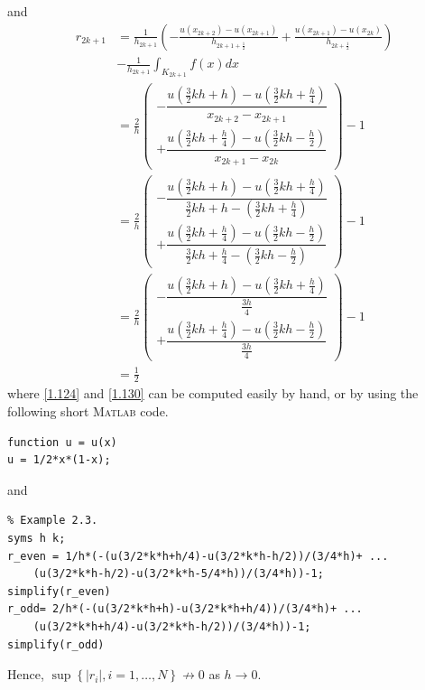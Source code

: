 \documentclass[a4paper]{article}
\numberwithin{equation}{section}
\begin{document}
and
\begin{align}
{r_{2k + 1}} &= \frac{1}{{{h_{2k + 1}}}}\left( { - \frac{{u\left( {{x_{2k + 2}}} \right) - u\left( {{x_{2k + 1}}} \right)}}{{{h_{2k + 1 + \frac{1}{2}}}}} + \frac{{u\left( {{x_{2k + 1}}} \right) - u\left( {{x_{2k}}} \right)}}{{{h_{2k + \frac{1}{2}}}}}} \right)\\
& - \frac{1}{{{h_{2k + 1}}}}\int_{{K_{2k + 1}}} {f\left( x \right)dx} \\
& = \frac{2}{h}\left( \begin{array}{l}
 - \dfrac{{u\left( {\frac{3}{2}kh + h} \right) - u\left( {\frac{3}{2}kh + \frac{h}{4}} \right)}}{{{x_{2k + 2}} - {x_{2k + 1}}}}\\
 + \dfrac{{u\left( {\frac{3}{2}kh + \frac{h}{4}} \right) - u\left( {\frac{3}{2}kh - \frac{h}{2}} \right)}}{{{x_{2k + 1}} - {x_{2k}}}}
\end{array} \right) - 1\\
& = \frac{2}{h}\left( \begin{array}{l}
 - \dfrac{{u\left( {\frac{3}{2}kh + h} \right) - u\left( {\frac{3}{2}kh + \frac{h}{4}} \right)}}{{\frac{3}{2}kh + h - \left( {\frac{3}{2}kh + \frac{h}{4}} \right)}}\\
 + \dfrac{{u\left( {\frac{3}{2}kh + \frac{h}{4}} \right) - u\left( {\frac{3}{2}kh - \frac{h}{2}} \right)}}{{\frac{3}{2}kh + \frac{h}{4} - \left( {\frac{3}{2}kh - \frac{h}{2}} \right)}}
\end{array} \right) - 1\\
& = \frac{2}{h}\left( \begin{array}{l}
 - \dfrac{{u\left( {\frac{3}{2}kh + h} \right) - u\left( {\frac{3}{2}kh + \frac{h}{4}} \right)}}{{\frac{{3h}}{4}}}\\
 + \dfrac{{u\left( {\frac{3}{2}kh + \frac{h}{4}} \right) - u\left( {\frac{3}{2}kh - \frac{h}{2}} \right)}}{{\frac{{3h}}{4}}}
\end{array} \right) - 1\\
 &= \frac{1}{2} \label{1.130}
\end{align}
where \eqref{1.124} and \eqref{1.130} can be computed easily by hand, or by using the following short \textsc{Matlab} code.
\begin{verbatim}
function u = u(x)
u = 1/2*x*(1-x);
\end{verbatim} 
and 
\begin{verbatim}
% Example 2.3.
syms h k;
r_even = 1/h*(-(u(3/2*k*h+h/4)-u(3/2*k*h-h/2))/(3/4*h)+ ...
    (u(3/2*k*h-h/2)-u(3/2*k*h-5/4*h))/(3/4*h))-1;
simplify(r_even)
r_odd= 2/h*(-(u(3/2*k*h+h)-u(3/2*k*h+h/4))/(3/4*h)+ ...
    (u(3/2*k*h+h/4)-u(3/2*k*h-h/2))/(3/4*h))-1;
simplify(r_odd)
\end{verbatim}
Hence, $\sup \left\{ {\left| {{r_i}} \right|,i = 1, \ldots ,N} \right\}\not  \to 0$ as $h\to 0$.
\end{document}
